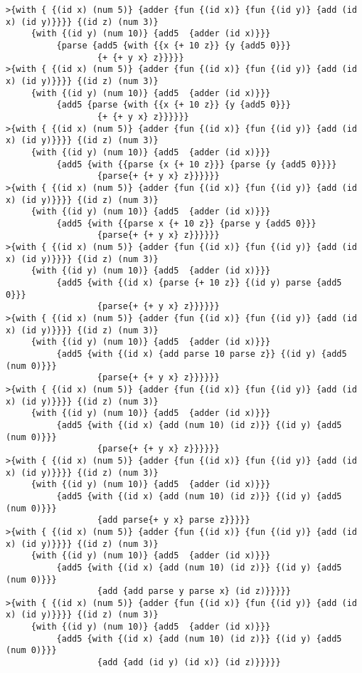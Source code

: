 \documentclass[letterpaper,11pt]{article}
\begin{document}
\begin{verbatim}
>{with { {(id x) (num 5)} {adder {fun {(id x)} {fun {(id y)} {add (id x) (id y)}}}} {(id z) (num 3)}
     {with {(id y) (num 10)} {add5  {adder (id x)}}}
          {parse {add5 {with {{x {+ 10 z}} {y {add5 0}}}
                  {+ {+ y x} z}}}}}
>{with { {(id x) (num 5)} {adder {fun {(id x)} {fun {(id y)} {add (id x) (id y)}}}} {(id z) (num 3)}
     {with {(id y) (num 10)} {add5  {adder (id x)}}}
          {add5 {parse {with {{x {+ 10 z}} {y {add5 0}}}
                  {+ {+ y x} z}}}}}}
>{with { {(id x) (num 5)} {adder {fun {(id x)} {fun {(id y)} {add (id x) (id y)}}}} {(id z) (num 3)}
     {with {(id y) (num 10)} {add5  {adder (id x)}}}
          {add5 {with {{parse {x {+ 10 z}}} {parse {y {add5 0}}}}
                  {parse{+ {+ y x} z}}}}}}
>{with { {(id x) (num 5)} {adder {fun {(id x)} {fun {(id y)} {add (id x) (id y)}}}} {(id z) (num 3)}
     {with {(id y) (num 10)} {add5  {adder (id x)}}}
          {add5 {with {{parse x {+ 10 z}} {parse y {add5 0}}}
                  {parse{+ {+ y x} z}}}}}}
>{with { {(id x) (num 5)} {adder {fun {(id x)} {fun {(id y)} {add (id x) (id y)}}}} {(id z) (num 3)}
     {with {(id y) (num 10)} {add5  {adder (id x)}}}
          {add5 {with {(id x) {parse {+ 10 z}} {(id y) parse {add5 0}}}
                  {parse{+ {+ y x} z}}}}}}
>{with { {(id x) (num 5)} {adder {fun {(id x)} {fun {(id y)} {add (id x) (id y)}}}} {(id z) (num 3)}
     {with {(id y) (num 10)} {add5  {adder (id x)}}}
          {add5 {with {(id x) {add parse 10 parse z}} {(id y) {add5 (num 0)}}}
                  {parse{+ {+ y x} z}}}}}}
>{with { {(id x) (num 5)} {adder {fun {(id x)} {fun {(id y)} {add (id x) (id y)}}}} {(id z) (num 3)}
     {with {(id y) (num 10)} {add5  {adder (id x)}}}
          {add5 {with {(id x) {add (num 10) (id z)}} {(id y) {add5 (num 0)}}}
                  {parse{+ {+ y x} z}}}}}}
>{with { {(id x) (num 5)} {adder {fun {(id x)} {fun {(id y)} {add (id x) (id y)}}}} {(id z) (num 3)}
     {with {(id y) (num 10)} {add5  {adder (id x)}}}
          {add5 {with {(id x) {add (num 10) (id z)}} {(id y) {add5 (num 0)}}}
                  {add parse{+ y x} parse z}}}}}
>{with { {(id x) (num 5)} {adder {fun {(id x)} {fun {(id y)} {add (id x) (id y)}}}} {(id z) (num 3)}
     {with {(id y) (num 10)} {add5  {adder (id x)}}}
          {add5 {with {(id x) {add (num 10) (id z)}} {(id y) {add5 (num 0)}}}
                  {add {add parse y parse x} (id z)}}}}}
>{with { {(id x) (num 5)} {adder {fun {(id x)} {fun {(id y)} {add (id x) (id y)}}}} {(id z) (num 3)}
     {with {(id y) (num 10)} {add5  {adder (id x)}}}
          {add5 {with {(id x) {add (num 10) (id z)}} {(id y) {add5 (num 0)}}}
                  {add {add (id y) (id x)} (id z)}}}}}











\end{verbatim}
\end{document}
